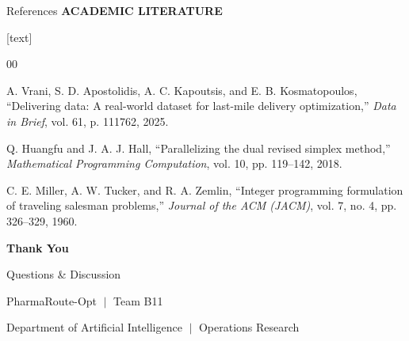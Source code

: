 \documentclass[aspectratio=169,10pt]{beamer}
\newcommand{\sectiontag}[1]{%
    {\scriptsize\bfseries\color{Accent}\MakeUppercase{#1}}\par\vspace{0.08cm}
}
\begin{document}
\begin{frame}{References}
\sectiontag{Academic Literature}

\vspace{-0.1cm}

[text]


\begin{thebibliography}{00}
\footnotesize
\setlength{\itemsep}{5pt}

A. Vrani, S. D. Apostolidis, A. C. Kapoutsis, and E. B. Kosmatopoulos, ``Delivering data: A real-world dataset for last-mile delivery optimization,'' \emph{Data in Brief}, vol. 61, p. 111762, 2025.

Q. Huangfu and J. A. J. Hall, ``Parallelizing the dual revised simplex method,'' \emph{Mathematical Programming Computation}, vol. 10, pp. 119--142, 2018.

C. E. Miller, A. W. Tucker, and R. A. Zemlin, ``Integer programming formulation of traveling salesman problems,'' \emph{Journal of the ACM (JACM)}, vol. 7, no. 4, pp. 326--329, 1960.

\end{thebibliography}

\vfill
\end{frame}


\begin{frame}[plain]
    \vspace{2.1cm}
    \begin{center}
        {\color{white}\fontsize{30}{36}\selectfont\bfseries Thank You\par}
        \vspace{0.35cm}
        {\color{SoftBlue}\large Questions \& Discussion\par}
        \vspace{0.5cm}
        {\color{white}\small PharmaRoute-Opt $\;\vert\;$ Team B11\par}
        {\color{SoftBlue}\scriptsize Department of Artificial Intelligence $\;\vert\;$ Operations Research\par}
    \end{center}
\end{frame}
\usebackgroundtemplate{}
\end{document}
